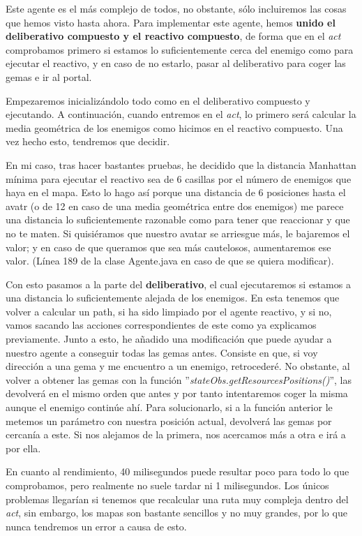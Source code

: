\documentclass[11pt,a4paper]{article}
\begin{document}
Este agente es el más complejo de todos, no obstante, sólo incluiremos las cosas que hemos visto hasta ahora. Para
implementar este agente, hemos \textbf{unido el deliberativo compuesto y el reactivo compuesto}, de forma que en
el \textit{act} comprobamos primero si estamos lo suficientemente cerca del enemigo como para ejecutar el reactivo,
y en caso de no estarlo, pasar al deliberativo para coger las gemas e ir al portal.

Empezaremos inicializándolo todo como en el deliberativo compuesto y ejecutando. A continuación, cuando entremos
en el \textit{act}, lo primero será calcular la media geométrica de los enemigos como hicimos en el reactivo
compuesto. Una vez hecho esto, tendremos que decidir.

En mi caso, tras hacer bastantes pruebas, he decidido que la distancia Manhattan mínima para ejecutar el reactivo
sea de 6 casillas por el número de enemigos que haya en el mapa. Esto lo hago así porque una distancia de 6
posiciones hasta el avatr (o de 12 en caso de una media geométrica entre dos enemigos) me parece una distancia lo
suficientemente razonable como para tener que reaccionar y que no te maten. Si quisiéramos que nuestro avatar se
arriesgue más, le bajaremos el valor; y en caso de que queramos que sea más cautelosos, aumentaremos ese valor.
(Línea 189 de la clase Agente.java en caso de que se quiera modificar).

Con esto pasamos a la parte del \textbf{deliberativo}, el cual ejecutaremos si estamos a una distancia lo
suficientemente alejada de los enemigos. En esta tenemos que volver a calcular un path, si ha sido limpiado por
el agente reactivo, y si no, vamos sacando las acciones correspondientes de este como ya explicamos previamente.
Junto a esto, he añadido una modificación que puede ayudar a nuestro agente a conseguir todas las gemas antes.
Consiste en que, si voy dirección a una gema y me encuentro a un enemigo, retrocederé. No obstante, al volver a
obtener las gemas con la función ''\textit{stateObs.getResourcesPositions()}'', las devolverá en el mismo orden que
antes y por tanto intentaremos coger la misma aunque el enemigo continúe ahí. Para solucionarlo, si a la función
anterior le metemos un parámetro con nuestra posición actual, devolverá las gemas por cercanía a este. Si nos
alejamos de la primera, nos acercamos más a otra e irá a por ella.

En cuanto al rendimiento, 40 milisegundos puede resultar poco para todo lo que comprobamos, pero realmente no
suele tardar ni 1 milisegundos. Los únicos problemas llegarían si tenemos que recalcular una ruta muy compleja
dentro del \textit{act}, sin embargo, los mapas son bastante sencillos y no muy grandes, por lo que nunca
tendremos un error a causa de esto.
\end{document}
